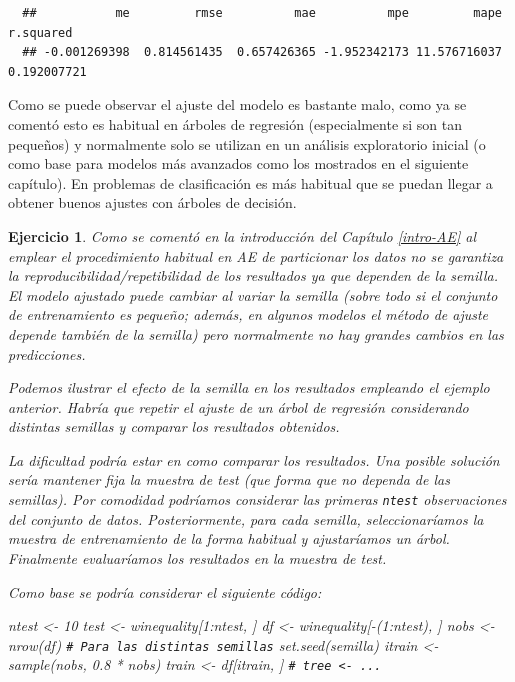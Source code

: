 \documentclass[
]{book}
\newenvironment{Shaded}{\begin{snugshade}}{\end{snugshade}}
\newcommand{\CommentTok}[1]{\textcolor[rgb]{0.56,0.35,0.01}{\textit{#1}}}
\newcommand{\DecValTok}[1]{\textcolor[rgb]{0.00,0.00,0.81}{#1}}
\newcommand{\FloatTok}[1]{\textcolor[rgb]{0.00,0.00,0.81}{#1}}
\newcommand{\FunctionTok}[1]{\textcolor[rgb]{0.00,0.00,0.00}{#1}}
\newcommand{\NormalTok}[1]{#1}
\newcommand{\OtherTok}[1]{\textcolor[rgb]{0.56,0.35,0.01}{#1}}
\newcommand{\SpecialCharTok}[1]{\textcolor[rgb]{0.00,0.00,0.00}{#1}}
\theoremstyle{break}
\newtheorem{exercise}{Ejercicio}[chapter]
\theoremstyle{nonumberplain}
\renewcommand{\CommentTok}[1]{\textcolor[rgb]{0.41,0.41,0.41}{\texttt{#1}}}
\begin{document}
\begin{verbatim}
  ##           me         rmse          mae          mpe         mape    r.squared 
  ## -0.001269398  0.814561435  0.657426365 -1.952342173 11.576716037  0.192007721
\end{verbatim}

Como se puede observar el ajuste del modelo es bastante malo, como ya se comentó esto es habitual en árboles de regresión (especialmente si son tan pequeños) y normalmente solo se utilizan en un análisis exploratorio inicial (o como base para modelos más avanzados como los mostrados en el siguiente capítulo).
En problemas de clasificación es más habitual que se puedan llegar a obtener buenos ajustes con árboles de decisión.

\begin{exercise}
\protect\hypertarget{exr:efecto-semilla}{}\label{exr:efecto-semilla}Como se comentó en la introducción del Capítulo \ref{intro-AE} al emplear el procedimiento habitual en AE de particionar los datos no se garantiza la reproducibilidad/repetibilidad de los resultados ya que dependen de la semilla.
El modelo ajustado puede cambiar al variar la semilla (sobre todo si el conjunto de entrenamiento es pequeño; además, en algunos modelos el método de ajuste depende también de la semilla) pero normalmente no hay grandes cambios en las predicciones.

Podemos ilustrar el efecto de la semilla en los resultados empleando el ejemplo anterior.
Habría que repetir el ajuste de un árbol de regresión considerando distintas semillas y comparar los resultados obtenidos.

La dificultad podría estar en como comparar los resultados.
Una posible solución sería mantener fija la muestra de test (que forma que no dependa de las semillas).
Por comodidad podríamos considerar las primeras \texttt{ntest} observaciones del conjunto de datos.
Posteriormente, para cada semilla, seleccionaríamos la muestra de entrenamiento de la forma habitual y ajustaríamos un árbol. Finalmente evaluaríamos los resultados en la muestra de test.

Como base se podría considerar el siguiente código:

\begin{Shaded}
\begin{Highlighting}[]
\NormalTok{ntest }\OtherTok{\textless{}{-}} \DecValTok{10}
\NormalTok{test }\OtherTok{\textless{}{-}}\NormalTok{ winequality[}\DecValTok{1}\SpecialCharTok{:}\NormalTok{ntest, ]}
\NormalTok{df }\OtherTok{\textless{}{-}}\NormalTok{ winequality[}\SpecialCharTok{{-}}\NormalTok{(}\DecValTok{1}\SpecialCharTok{:}\NormalTok{ntest), ]}
\NormalTok{nobs }\OtherTok{\textless{}{-}} \FunctionTok{nrow}\NormalTok{(df)}
\CommentTok{\# Para las distintas semillas}
\FunctionTok{set.seed}\NormalTok{(semilla)}
\NormalTok{itrain }\OtherTok{\textless{}{-}} \FunctionTok{sample}\NormalTok{(nobs, }\FloatTok{0.8} \SpecialCharTok{*}\NormalTok{ nobs)}
\NormalTok{train }\OtherTok{\textless{}{-}}\NormalTok{ df[itrain, ]}
\CommentTok{\# tree \textless{}{-} ...}
\end{Highlighting}
\end{Shaded}


\end{exercise}
\end{document}
